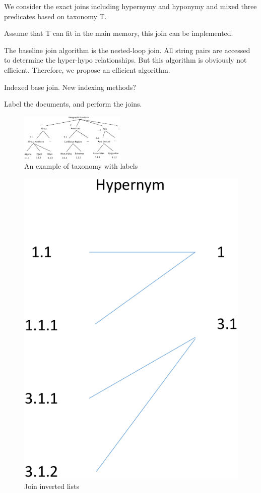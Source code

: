 \documentclass{sig-alternate}
\begin{document}
We consider the exact joins including hypernymy and hyponymy and mixed three predicates based on taxonomy T.

Assume that T can fit in the main memory, this join can be implemented.

The baseline join algorithm is the nested-loop join. All string pairs are accessed to determine the hyper-hypo relationships. But this algorithm is obviously not efficient. Therefore, we propose an efficient algorithm.


Indexed base join. New indexing methods?

Label the documents, and perform the joins.

\begin{figure}[t]
\centering
\includegraphics[width=0.45\textwidth]{figures/taxonomylabels}
 \caption{An example of taxonomy with labels}
\label{fig:taxonomy}
\end{figure}



\begin{figure}[t]
\centering
\includegraphics[scale=0.4]{figures/labeljoins}
 \caption{Join inverted lists}
\label{fig:taxonomy}
\end{figure}
\end{document}
